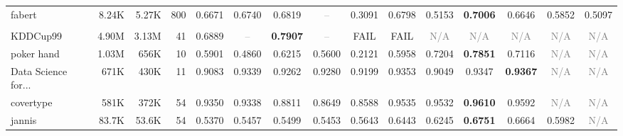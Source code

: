 \begin{table}[t]
{\begin{tabular}{lrrrccccccccccc}
fabert & 8.24K & 5.27K & 800 & \cellcolor[HTML]{E0EBD2}0.6671 & \cellcolor[HTML]{DEEBD2}0.6740 & \cellcolor[HTML]{DDEBD2}0.6819 & \textcolor{gray}{--} & \cellcolor[HTML]{F4CCCC}0.3091 & \cellcolor[HTML]{DDEBD2}0.6798 & \cellcolor[HTML]{FDF2CC}0.5153 & \cellcolor[HTML]{D9EAD3}\textbf{0.7006} & \cellcolor[HTML]{E0EBD2}0.6646 & \cellcolor[HTML]{EFEFCF}0.5852 & \cellcolor[HTML]{FEF2CC}0.5097 \\
\addlinespace[2pt]
\rowcolor{gray!15}
\multicolumn{15}{l}{\textbf{Macro F1}} \\
KDDCup99 & 4.90M & 3.13M & 41 & \cellcolor[HTML]{F4CCCC}0.6889 & \textcolor{gray}{--} & \cellcolor[HTML]{D9EAD3}\textbf{0.7907} & \textcolor{gray}{--} & \textcolor{red!70!black}{FAIL} & \textcolor{red!70!black}{FAIL} & \textcolor{gray}{N/A} & \textcolor{gray}{N/A} & \textcolor{gray}{N/A} & \textcolor{gray}{N/A} & \textcolor{gray}{N/A} \\
poker hand & 1.03M & 656K & 10 & \cellcolor[HTML]{F3EFCE}0.5901 & \cellcolor[HTML]{FFF0CC}0.4860 & \cellcolor[HTML]{EFEFCF}0.6215 & \cellcolor[HTML]{F7F0CE}0.5600 & \cellcolor[HTML]{F4CCCC}0.2121 & \cellcolor[HTML]{F2EFCE}0.5958 & \cellcolor[HTML]{E2ECD1}0.7204 & \cellcolor[HTML]{D9EAD3}\textbf{0.7851} & \cellcolor[HTML]{E3ECD1}0.7116 & \textcolor{gray}{N/A} & \textcolor{gray}{N/A} \\
Data Science for... & 671K & 430K & 11 & \cellcolor[HTML]{F6D4CC}0.9083 & \cellcolor[HTML]{E0EBD2}0.9339 & \cellcolor[HTML]{F2EFCE}0.9262 & \cellcolor[HTML]{EEEECF}0.9280 & \cellcolor[HTML]{FEF0CC}0.9199 & \cellcolor[HTML]{DCEBD2}0.9353 & \cellcolor[HTML]{F4CCCC}0.9049 & \cellcolor[HTML]{DEEBD2}0.9347 & \cellcolor[HTML]{D9EAD3}\textbf{0.9367} & \textcolor{gray}{N/A} & \textcolor{gray}{N/A} \\
covertype & 581K & 372K & 54 & \cellcolor[HTML]{ECEECF}0.9350 & \cellcolor[HTML]{EDEECF}0.9338 & \cellcolor[HTML]{F9DDCC}0.8811 & \cellcolor[HTML]{F5D1CC}0.8649 & \cellcolor[HTML]{F4CCCC}0.8588 & \cellcolor[HTML]{DFEBD2}0.9535 & \cellcolor[HTML]{DFEBD2}0.9532 & \cellcolor[HTML]{D9EAD3}\textbf{0.9610} & \cellcolor[HTML]{DAEAD3}0.9592 & \textcolor{gray}{N/A} & \textcolor{gray}{N/A} \\
jannis & 83.7K & 53.6K & 54 & \cellcolor[HTML]{F4CCCC}0.5370 & \cellcolor[HTML]{F5D1CC}0.5457 & \cellcolor[HTML]{F6D3CC}0.5499 & \cellcolor[HTML]{F5D1CC}0.5453 & \cellcolor[HTML]{F8DBCC}0.5643 & \cellcolor[HTML]{EAEED0}0.6443 & \cellcolor[HTML]{F5F0CE}0.6245 & \cellcolor[HTML]{D9EAD3}\textbf{0.6751} & \cellcolor[HTML]{DEEBD2}0.6664 & \cellcolor[HTML]{FEEECC}0.5982 & \textcolor{gray}{N/A} \\

\end{tabular}}
\end{table}
